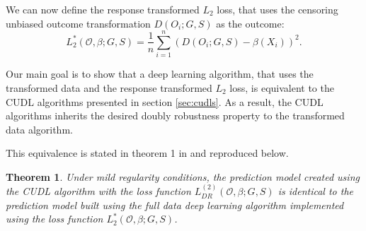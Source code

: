 \documentclass[12pt, a4paper]{scrartcl}
\theoremstyle{definition}
\theoremstyle{plain}
\newtheorem{Theorem}{Theorem}[section]
\numberwithin{equation}{section}
\numberwithin{figure}{section}
\numberwithin{table}{section}
\begin{document}
	We can now define the response transformed $L_2$ loss, that uses the censoring unbiased outcome transformation $D(O_i;G,S)$ as the outcome:
	\begin{equation*}
	L_2^*(\mathcal{O}, \beta; G,S) = \frac{1}{n} \sum_{i=1}^n (D(O_i;G,S)-\beta(X_i))^2.
	\end{equation*}
	
	Our main goal is to show that a deep learning algorithm, that uses the transformed data and the response transformed $L_2$ loss, is equivalent to the CUDL algorithms presented in section \ref{sec:cudls}.
	As a result, the CUDL algorithms inherits the desired doubly robustness property to the transformed data algorithm.
	
	This equivalence is stated in theorem 1 in \citet*{basearticle} and reproduced below.
	
	\begin{Theorem}\label{thm:equi}
		Under mild regularity conditions, the prediction model created using the CUDL algorithm with the loss function $L_{DR}^{(2)}(\mathcal{O}, \beta; G,S)$ is identical to the prediction model built using the full data deep learning algorithm implemented using the loss function $L_2^*(\mathcal{O}, \beta; G,S)$.
	\end{Theorem}
	
\end{document}
